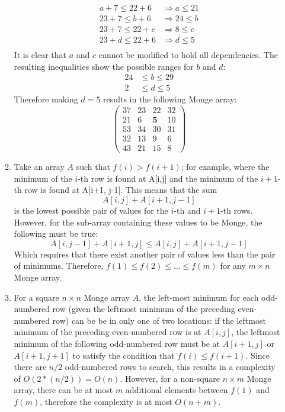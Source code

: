 \documentclass{article}
\begin{document}
\begin{enumerate}
\begin{enumerate}
\begin{align*}
            a + 7 \leq 22 + 6 &\Rightarrow a \leq 21 \\
            23 + 7 \leq b + 6 &\Rightarrow 24 \leq b \\
            23 + 7 \leq 22 + c &\Rightarrow 8 \leq c \\
            23 + d \leq 22 + 6 &\Rightarrow d \leq 5 \\
        \end{align*}
        It is clear that $a$ and $c$ cannot be modified to hold all dependencies. The resulting inequalities show the possible ranges for $b$ and $d$:
        \begin{align*}
            24 &\leq b \leq 29 \\
            2 &\leq d \leq 5
        \end{align*}
        Therefore making $d=5$ results in the following Monge array:
        \[
        \left(
        \begin{array}{cccc}
        37 & 23 & 22 & 32 \\
        21 & 6 & \textbf{5} & 10 \\
        53 & 34 & 30 & 31 \\
        32 & 13 & 9 & 6 \\
        43 & 21 & 15 & 8 \end{array}
        \right)\]

        \item Take an array $A$ such that $f(i) > f(i+1)$; for example, where the minimum of the $i$-th row is found at A[i,j] and the minimum of the $i+1$-th row is found at A[i+1, j-1]. This means that the sum
        $$A[i,j] + A[i+1, j-1]$$
        is the lowest possible pair of values for the $i$-th and $i+1$-th rows. However, for the sub-array containing these values to be Monge, the following must be true:
        $$A[i, j-1] + A[i+1, j] \leq A[i,j] + A[i+1, j-1]$$
        Which requires that there exist another pair of values less than the pair of minimums. Therefore, $f(1) \leq f(2) \leq \dots \leq f(m)$ for any $m\times n$ Monge array.
        \item For a square $n\times n$ Monge array $A$, the left-most minimum for each odd-numbered row (given the leftmost minimum of the preceding even-numbered row) can be be in only one of two locations: if the leftmost minimum of the preceding even-numbered row is at $A[i,j]$, the leftmost minimum of the following odd-numbered row must be at $A[i+1,j]$ or $A[i+1,j+1]$ to satisfy the condition that $f(i) \leq f(i+1)$. Since there are $n/2$ odd-numbered rows to search, this results in a complexity of $O(2*(n/2)) = O(n)$. However, for a non-square $n\times m$ Monge array, there can be at most $m$ additional elements between $f(1)$ and $f(m)$, therefore the complexity is at most $O(n+m)$. 
    \end{enumerate}


\end{enumerate}
\end{document}
